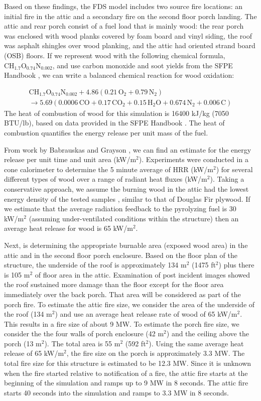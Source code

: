 \documentclass[11pt,oneside]{book}
\renewcommand{\C}{\mbox{C}}
\renewcommand{\H}{\mbox{H}}
\renewcommand{\O}{\mbox{O}}
\newcommand{\N}{\mbox{N}}
\begin{document}
Based on these findings, the FDS model includes two source fire locations: an initial fire in the attic and a secondary fire on the second floor porch landing. The attic and rear porch consist of a fuel load that is mainly wood: the rear porch was enclosed with wood planks covered by foam board and vinyl siding, the roof was asphalt shingles over wood planking, and the attic had oriented strand board (OSB) floors. If we represent wood with the following chemical formula, $\C\H_{1.7}\O_{0.74}\N_{0.002}$, and use carbon monoxide and soot yields from the SFPE Handbook \cite{SFPE:Tewarson}, we can write a balanced chemical reaction for wood oxidation:

\begin{multline}
\C\H_{1.7}\O_{0.74}\N_{0.002} + 4.86(0.21\,\O_{2} + 0.79\,\N_{2}) \\ 
\rightarrow 5.69(0.0006\,\C\O + 0.17\,\C\O_{2} + 0.15\,\H_{2}\O + 0.674\,\N_{2} + 0.006\,\C)
\label{eq:wood_comb}
\end{multline}
The heat of combustion of wood for this simulation is 16400 kJ/kg (7050 BTU/lb), based on data provided in the SFPE Handbook \cite{SFPE:Tewarson}. The heat of combustion quantifies the energy release per unit mass of the fuel.

From work by Babrauskas and Grayson \cite{babrauskas1990}, we can find an estimate for the energy release per unit time and unit area (kW/m$^2$). Experiments were conducted in a cone calorimeter to determine the 5 minute average of HRR (kW/m$^2$) for several different types of wood over a range of radiant heat fluxes (kW/m$^2$). Taking a conservative approach, we assume the burning wood in the attic had the lowest energy density of the tested samples \cite{babrauskas1990}, similar to that of Douglas Fir plywood. If we estimate that the average radiation feedback to the pyrolyzing fuel is 30 kW/m$^2$ (assuming under-ventilated conditions within the structure) then an average heat release for wood is 65 kW/m$^2$.

Next, is determining the appropriate burnable area (exposed wood area) in the attic and in the second floor porch enclosure. Based on the floor plan of the structure, the underside of the roof is approximately 134 m$^2$ (1475 ft$^2$) plus there is 105 m$^2$ of floor area in the attic. Examination of post incident images showed the roof sustained more damage than the floor except for the floor area immediately over the back porch. That area will be considered as part of the porch fire. To estimate the attic fire size, we consider the area of the underside of the roof (134 m$^2$) and use an average heat release rate of wood of 65 kW/m$^2$. This results in a fire size of about 9 MW. To estimate the porch fire size, we consider the the four walls of porch enclosure (42 m$^2$) and the ceiling above the porch (13 m$^2$). The total area is 55 m$^2$ (592 ft$^2$). Using the same average heat release of 65 kW/m$^2$, the fire size on the porch is approximately 3.3 MW. The total fire size for this structure is estimated to be 12.3 MW. Since it is unknown when the fire started relative to notification of a fire, the attic fire starts at the beginning of the simulation and ramps up to 9 MW in 8 seconds. The attic fire starts 40 seconds into the simulation and ramps to 3.3 MW in 8 seconds.
\end{document}
